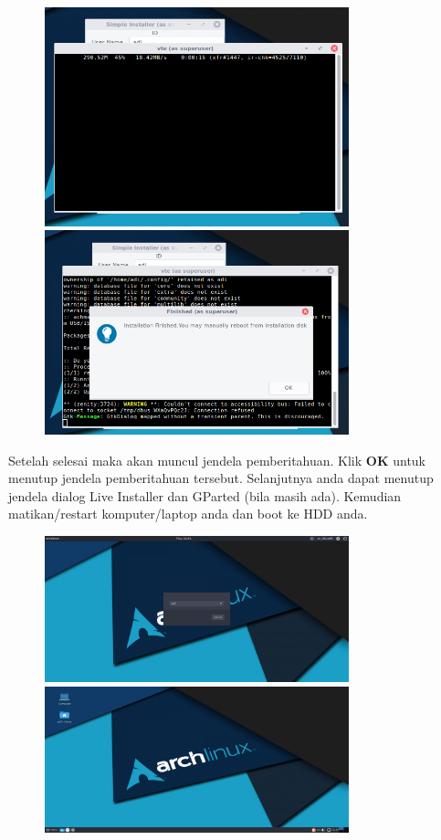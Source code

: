 \documentclass[12pt,]{article}
\begin{document}
	\begin{figure}[h]
		\centering
		\includegraphics[width=250pt]{installhdd/step_19}
		\includegraphics[width=250pt]{installhdd/step_20}
	\end{figure}

	Setelah selesai maka akan muncul jendela pemberitahuan.
	Klik \textbf{OK} untuk menutup jendela pemberitahuan tersebut.
	Selanjutnya anda dapat menutup jendela dialog Live Installer dan GParted (bila masih ada).
	Kemudian matikan/restart komputer/laptop anda dan boot ke HDD anda.
	
	\begin{figure}[h]
		\centering
		\includegraphics[width=250pt]{installhdd/step_21}
		\includegraphics[width=250pt]{installhdd/step_22}
	\end{figure}
	
\end{document}
